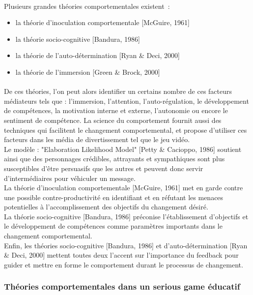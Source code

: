 \paragraph{}Plusieurs grandes théories comportementales existent~:
\begin{itemize}
	\item la théorie d’inoculation comportementale [McGuire, 1961]
	\item la théorie socio-cognitive [Bandura, 1986]
	\item la théorie de l’auto-détermination [Ryan \& Deci, 2000]
	\item la théorie de l’immersion [Green \& Brock, 2000]
\end{itemize}

\paragraph{}De ces théories, l’on peut alors identifier un certains nombre de ces facteurs médiateurs tels que : l’immersion, l’attention, l’auto-régulation, le développement de compétences, la motivation interne et externe, l’autonomie ou encore le sentiment de compétence. La science du comportement fournit aussi des techniques qui facilitent le changement comportemental, et propose d’utiliser ces facteurs dans les média de divertissement tel que le jeu vidéo.\\
Le modèle : "Elaboration Likelihood Model" [Petty \& Cacioppo, 1986] soutient ainsi que des personnages crédibles, attrayants et sympathiques sont plus susceptibles d’être persuasifs que les autres et peuvent donc servir d’intermédiaires pour véhiculer un message. \\
La théorie d’inoculation comportementale [McGuire, 1961] met en garde contre une possible contre-productivité en identifiant et en réfutant les menaces potentielles à l’accomplissement des objectifs du changement désiré.\\
La théorie socio-cognitive [Bandura, 1986] préconise l’établissement d’objectifs et le développement de compétences comme paramètres importants dans le changement comportemental.\\
Enfin, les théories socio-cognitive [Bandura, 1986] et d’auto-détermination [Ryan \& Deci, 2000] mettent toutes deux l’accent sur l’importance du feedback pour guider et mettre en forme le comportement durant le processus de changement.	

		\subsubsection*{Théories comportementales dans un serious game éducatif}
